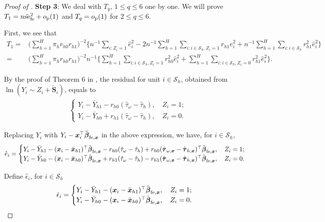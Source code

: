 \documentclass[12pt]{article}
\newcommand{\se}{\textnormal{se}}
\newcommand{\lmm}{\operatorname{lm}}
\newcommand{\op}{o_{\textnormal{p}}}
\newcommand{\ms}{\mathcal{S}}
\newcommand{\fe}{\textnormal{fe}}
\newcommand{\bs}{\boldsymbol}
\begin{document}
\begin{proof}[Proof of ]
\noindent \textbf{Step 3}: We deal with $T_q$, $1 \leq q \leq 6$ one by one. We will prove $T_1 = n\tilde{\se}_{\fe }^2 + \op(1)$ and $T_q = \op(1)$ for $2 \leq q \leq 6$.

First, we see that
\begin{align*}
    T_1 =& \Big(\sum_{h=1}^H \pi_{h} r_{h0} r_{h1}\Big)^{-2}\Big\{ n^{-1}\sum_{i:Z_i=1} \hat{e}_i^2 -2n^{-1}\sum_{h=1}^H \sum_{i:i\in\ms_h,Z_i=1}r_{h1} \hat{e}_i^2 + n^{-1}\sum_{h=1}^H \sum_{i:i\in\ms_h}r_{h1}^2 \hat{e}_i^2\Big\} \\
    =& \Big(\sum_{h=1}^H \pi_{h} r_{h0} r_{h1}\Big)^{-2}n^{-1} \Big\{\sum_{h=1}^H \sum_{i:i\in\ms_h,Z_i=1}r_{h0}^2  \hat{e}_i^2 + \sum_{h=1}^H \sum_{i:i\in\ms_h, Z_i=0}r_{h1}^2 \hat{e}_i^2\Big\}. 
\end{align*} 

By the proof of Theorem 6 in \cite{ding2021frisch}, the residual for unit $i\in \ms_h$, obtained from $\lmm(Y_i \sim Z_i+ \tilde{\bs{S}}_i)$, equals to
\begin{align*}
\begin{cases}
        Y_i - \bar{Y}_{h1} - r_{h0}(\hat{\tau}_{\omega}-\hat{\tau}_{h}),\quad Z_i=1;\\
        Y_i - \bar{Y}_{h0} + r_{h1}(\hat{\tau}_{\omega}-\hat{\tau}_{h}), \quad Z_i=0.
    \end{cases}
\end{align*}

Replacing $Y_i$ with $Y_i - \bs{x}_i^\top \hat{\bs{\beta}}_{\fe, \bs{x}}$ in the above expression, we have, for $i \in \ms_h$,
\begin{align*}
    \hat{e}_i = \begin{cases}
        Y_i - \bar{Y}_{h1} - (\bs{x}_i - \bar{\bs{x}}_{h1})^\top\hat{\bs{\beta}}_{\fe, \bs{x}} - r_{h0}(\hat{\tau}_{\omega}-\hat{\tau}_{h}) + r_{h0}(\hat{\bs{\tau}}_{\omega, \bs{x}}-\hat{\bs{\tau}}_{h, \bs{x}})^\top \hat{\bs{\beta}}_{\fe, \bs{x}},\quad Z_i=1;\\
        Y_i - \bar{Y}_{h0} - (\bs{x}_i - \bar{\bs{x}}_{h0})^\top\hat{\bs{\beta}}_{\fe, \bs{x}} + r_{h1}(\hat{\tau}_{\omega}-\hat{\tau}_{h}) - r_{h1}(\hat{\bs{\tau}}_{\omega, \bs{x}}-\hat{\bs{\tau}}_{h, \bs{x}})^\top \hat{\bs{\beta}}_{\fe, \bs{x}}, \quad Z_i=0.
    \end{cases}
\end{align*}

Define $\hat{\epsilon}_i$, for $i\in \ms_h$
\begin{align*}
    \hat{\epsilon}_i = \begin{cases}
        Y_i - \bar{Y}_{h1} - (\bs{x}_i - \bar{\bs{x}}_{h1})^\top\hat{\bs{\beta}}_{\fe, \bs{x}} ,\quad Z_i=1;\\
        Y_i - \bar{Y}_{h0} - (\bs{x}_i - \bar{\bs{x}}_{h0})^\top\hat{\bs{\beta}}_{\fe, \bs{x}} , \quad Z_i=0.
    \end{cases}
\end{align*}


\end{proof}
\end{document}
